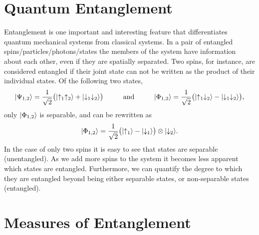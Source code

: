 \section{Quantum Entanglement}
Entanglement is one important and interesting feature that differentiates quantum mechanical systems from classical systems.
In a pair of entangled spins/particles/photons/states the members of the system have information about each other, even if they are spatially separated.
Two spins, for instance, are considered entangled if their joint state can not be written as the product of their individual states.  Of the following two states,
\begin{equation}
	\lvert {\Psi_{1,2}} \rangle = \frac{1}{\sqrt{2}} \big( \lvert {\uparrow_1\uparrow_2} \rangle + \lvert {\downarrow_1\downarrow_2} \rangle\big) 
	\hspace{1cm} \text{and} \hspace{1cm}
	\lvert {\Phi_{1,2}} \rangle = \frac{1}{\sqrt{2}} \big( \lvert {\uparrow_1\downarrow_2} \rangle - \lvert {\downarrow_1\downarrow_2} \rangle\big), 
\end{equation}
only $\lvert {\Phi_{1,2}} \rangle$ is separable, and can be rewritten as
\begin{equation}
	\lvert {\Phi_{1,2}} \rangle = \frac{1}{\sqrt{2}}  \big( \lvert {\uparrow_1} \rangle - \lvert {\downarrow_1} \rangle\big) \otimes \lvert {\downarrow_2} \rangle.
\end{equation}
In the case of only two spins it is easy to see that states are separable (unentangled). As we add more spins to the system it becomes less apparent which  states are entangled. Furthermore, we can quantify the degree to which they are entangled beyond being either separable states, or non-separable states (entangled).

\section{Measures of Entanglement}

